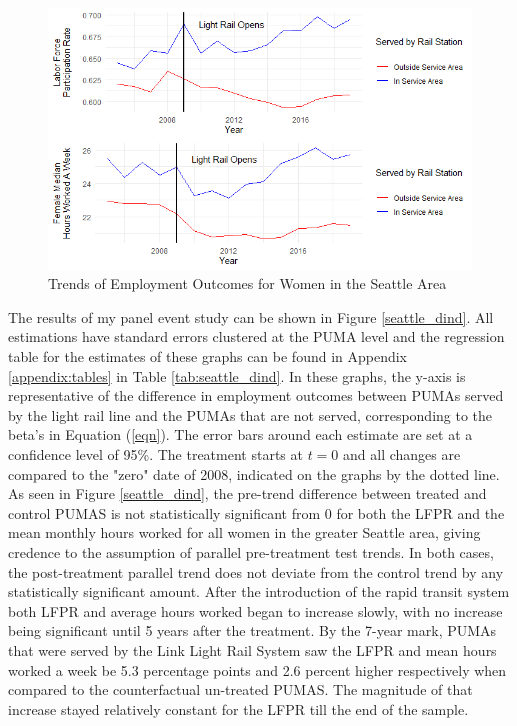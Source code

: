 \documentclass{article}
\begin{document}
\begin{figure}[hbt!]
\caption{Trends of Employment Outcomes for Women in the Seattle Area}
\label{seattle_emp}
\centering
\includegraphics[width=1\textwidth]{Graphs/emp_outcomes_seattle.png}
\end{figure}
\FloatBarrier

The results of my panel event study can be shown in Figure \ref{seattle_dind}. All estimations have standard errors clustered at the PUMA level and the regression table for the estimates of these graphs can be found in Appendix \ref{appendix:tables} in Table \ref{tab:seattle_dind}. In these graphs, the y-axis is representative of the difference in employment outcomes between PUMAs served by the light rail line and the PUMAs that are not served, corresponding to the beta's in Equation (\ref{eqn}). The error bars around each estimate are set at a confidence level of 95\%. The treatment starts at $t = 0$ and all changes are compared to the "zero" date of 2008, indicated on the graphs by the dotted line.\\ 

As seen in Figure \ref{seattle_dind}, the pre-trend difference between treated and control PUMAS is not statistically significant from 0 for both the LFPR and the mean monthly hours worked for all women in the greater Seattle area, giving credence to the assumption of parallel pre-treatment test trends. In both cases, the post-treatment parallel trend does not deviate from the control trend by any statistically significant amount. After the introduction of the rapid transit system both LFPR and average hours worked began to increase slowly, with no increase being significant until 5 years after the treatment. By the 7-year mark, PUMAs that were served by the Link Light Rail System saw the LFPR and mean hours worked a week be 5.3 percentage points and 2.6 percent higher respectively when compared to the counterfactual un-treated PUMAS. The magnitude of that increase stayed relatively constant for the LFPR till the end of the sample.\\
\end{document}
